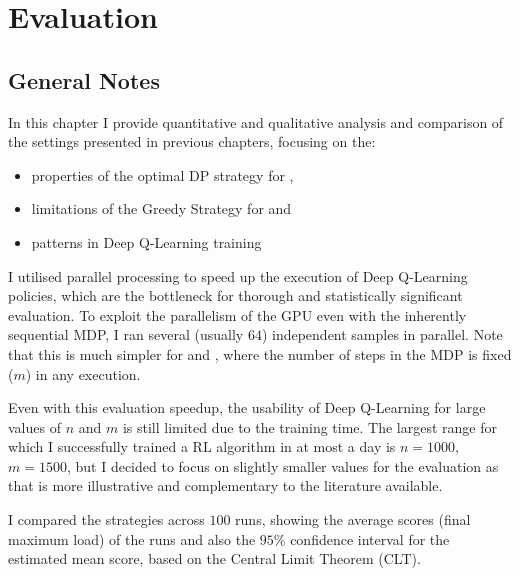 \chapter{Evaluation}\label{evaluation}


\ifpdf
    \graphicspath{{Chapter3/Figs/Raster/}{Chapter3/Figs/PDF/}{Chapter3/Figs/}}
\else
    \graphicspath{{Chapter3/Figs/Vector/}{Chapter3/Figs/}}
\fi


\section{General Notes} \label{evaluationnotes}

In this chapter I provide quantitative and qualitative analysis and comparison of the settings presented in previous chapters, focusing on the:

\begin{itemize}
    \item properties of the optimal DP strategy for \TwoThinning,
    \item limitations of the Greedy Strategy for \GraphicalTwoChoice and
    \item patterns in Deep Q-Learning training
\end{itemize} 

I utilised parallel processing to speed up the execution of Deep Q-Learning policies, which are the bottleneck for thorough and statistically significant evaluation. To exploit the parallelism of the GPU even with the inherently sequential MDP, I ran several (usually $64$) independent samples in parallel. Note that this is much simpler for \TwoThinning and \GraphicalTwoChoice, where the number of steps in the MDP is fixed ($m$) in any execution.


Even with this evaluation speedup, the usability of Deep Q-Learning for large values of $n$ and $m$ is still limited due to the training time. The largest range for which I successfully trained a RL algorithm in at most a day is $n=1000$, $m=1500$, but I decided to focus on slightly smaller values for the evaluation as that is more illustrative and complementary to the literature available.  


I compared the strategies across $100$ runs, showing the average scores (final maximum load) of the runs and also the $95\%$ confidence interval for the estimated mean score, based on the Central Limit Theorem (CLT). 


